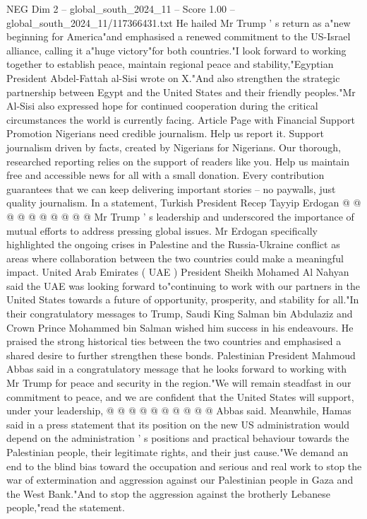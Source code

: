 \begin{textsample}{NEG Dim 2 – global\_south\_2024\_11 – Score 1.00 – global\_south\_2024\_11/117366431.txt}  \label{ex:f2_neg_207}
He hailed Mr Trump ' s return as a"new beginning for America"and emphasised a renewed commitment to the US-Israel alliance, calling it a"huge victory"for both countries."I look forward to working together to establish peace, maintain regional peace and stability,"Egyptian President Abdel-Fattah al-Sisi wrote on X."And also strengthen the strategic partnership between Egypt and the United States and their friendly peoples."Mr Al-Sisi also expressed hope for continued cooperation during the critical circumstances the world is currently facing.
Article Page with Financial Support Promotion Nigerians need credible journalism.
Help us report it.
Support journalism driven by facts, created by Nigerians for Nigerians.
Our thorough, researched reporting relies on the support of readers like you.
Help us maintain free and accessible news for all with a small donation.
Every contribution guarantees that we can keep delivering important stories -- no paywalls, just quality journalism.
In a statement, Turkish President Recep Tayyip Erdogan @ @ @ @ @ @ @ @ @ @ Mr Trump ' s leadership and underscored the importance of mutual efforts to address pressing global issues.
Mr Erdogan specifically highlighted the ongoing crises in Palestine and the Russia-Ukraine conflict as areas where collaboration between the two countries could make a meaningful impact.
United Arab Emirates ( UAE ) President Sheikh Mohamed Al Nahyan said the UAE was looking forward to"continuing to work with our partners in the United States towards a future of opportunity, prosperity, and stability for all."In their congratulatory messages to Trump, Saudi King Salman bin Abdulaziz and Crown Prince Mohammed bin Salman wished him success in his endeavours.
He praised the strong historical ties between the two countries and emphasised a shared desire to further strengthen these bonds.
Palestinian President Mahmoud Abbas said in a congratulatory message that he looks forward to working with Mr Trump for peace and security in the region."We will remain steadfast in our commitment to peace, and we are confident that the United States will support, under your leadership, @ @ @ @ @ @ @ @ @ @ Abbas said.
Meanwhile, Hamas said in a press statement that its position on the new US administration would depend on the administration ' s positions and practical behaviour towards the Palestinian people, their legitimate rights, and their just cause."We demand an end to the blind bias toward the occupation and serious and real work to stop the war of extermination and aggression against our Palestinian people in Gaza and the West Bank."And to stop the aggression against the brotherly Lebanese people,"read the statement.

\end{textsample}
